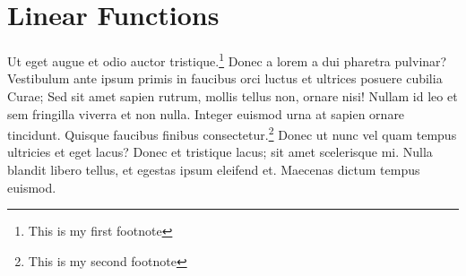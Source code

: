 \documentclass[12pt]{article}
\begin{document}
\section{Linear Functions}
Ut eget augue et odio auctor tristique.\footnote{This is my first footnote}
Donec a lorem a dui pharetra pulvinar?  Vestibulum ante ipsum primis in faucibus
orci luctus et ultrices posuere cubilia Curae; Sed sit amet sapien rutrum,
mollis tellus non, ornare nisi! Nullam id leo et sem fringilla viverra et non
nulla. Integer euismod urna at sapien ornare tincidunt. Quisque faucibus finibus
consectetur.\footnote{This is my second footnote} Donec ut nunc vel quam tempus
ultricies et eget lacus? Donec et tristique lacus; sit amet scelerisque mi.
Nulla blandit libero tellus, et egestas ipsum eleifend et. Maecenas dictum
tempus euismod.
\end{document}
